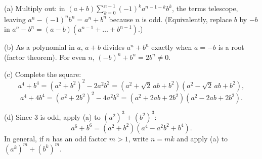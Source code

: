(a) Multiply out: in $(a+b)\sum_{k=0}^{n-1}(-1)^ka^{n-1-k}b^k$, the terms telescope, leaving $a^n-(-1)^nb^n=a^n+b^n$ because $n$ is odd. (Equivalently, replace $b$ by $-b$ in $a^n-b^n=(a-b)(a^{n-1}+\dots+b^{n-1})$.)

(b) As a polynomial in $a$, $a+b$ divides $a^n+b^n$ exactly when $a=-b$ is a root (factor theorem). For even $n$, $(-b)^n+b^n=2b^n\ne0$.

(c) Complete the square:
\[a^4+b^4=(a^2+b^2)^2-2a^2b^2=\left(a^2+\sqrt2\,ab+b^2\right)\left(a^2-\sqrt2\,ab+b^2\right),\]
\[a^4+4b^4=(a^2+2b^2)^2-4a^2b^2=\left(a^2+2ab+2b^2\right)\left(a^2-2ab+2b^2\right).\]

(d) Since $3$ is odd, apply (a) to $(a^2)^3+(b^2)^3$:
\[a^6+b^6=(a^2+b^2)(a^4-a^2b^2+b^4).\]
In general, if $n$ has an odd factor $m>1$, write $n=mk$ and apply (a) to $(a^k)^m+(b^k)^m$.
